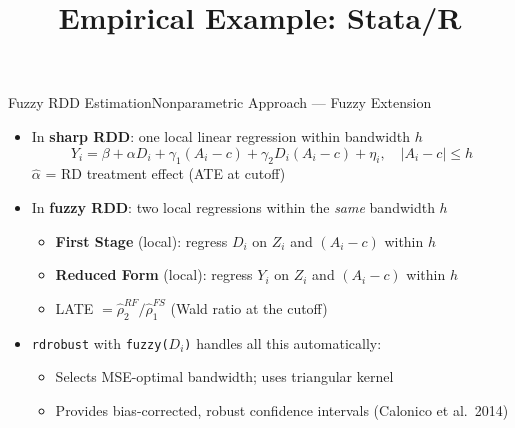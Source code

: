 \documentclass[hyperref={pdfpagelabels=false}]{beamer}
\begin{document}
\begin{frame}{Fuzzy RDD Estimation}{Nonparametric Approach --- Fuzzy Extension}
	\begin{itemize}
		\item In \textbf{sharp RDD}: one local linear regression within bandwidth $h$
		\begin{equation*}
			Y_i = \beta + \alpha D_i + \gamma_1(A_i-c) + \gamma_2 D_i(A_i-c) + \eta_i, \quad |A_i - c| \le h
		\end{equation*}
		$\hat{\alpha}$ = RD treatment effect (ATE at cutoff)
		\vspace{0.2cm}
		\item In \textbf{fuzzy RDD}: two local regressions within the \emph{same} bandwidth $h$
		\vspace{0.2cm}
		\begin{itemize}
			\item \textbf{First Stage} (local): regress $D_i$ on $Z_i$ and $(A_i - c)$ within $h$
			\vspace{0.2cm}
			\item \textbf{Reduced Form} (local): regress $Y_i$ on $Z_i$ and $(A_i - c)$ within $h$
			\vspace{0.2cm}
			\item LATE $= \hat{\rho}_2^{RF} / \hat{\rho}_1^{FS}$ (Wald ratio at the cutoff)
		\end{itemize}
		\vspace{0.2cm}
		\item \texttt{rdrobust} with \texttt{fuzzy($D_i$)} handles all this automatically:
		\vspace{0.2cm}
		\begin{itemize}
			\item Selects MSE-optimal bandwidth; uses triangular kernel
			\vspace{0.2cm}
			\item Provides bias-corrected, robust confidence intervals (Calonico et al.\ 2014)
		\end{itemize}
	\end{itemize}
\end{frame}


\title[]
{Empirical Example: Stata/R}

\author
{}

\institute{}

\date
{}

\begin{frame}{}
	\titlepage
\end{frame}
\end{document}
